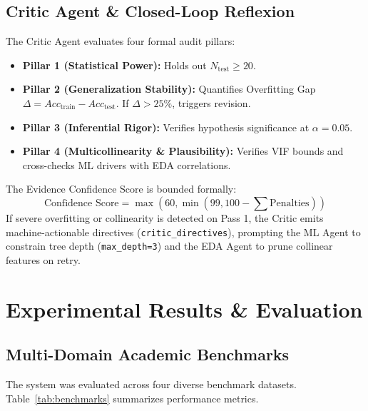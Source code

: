 \documentclass[10pt,journal,compsoc]{IEEEtran}
\begin{document}
\subsection{Critic Agent \& Closed-Loop Reflexion}
The Critic Agent evaluates four formal audit pillars:
\begin{itemize}
    \item \textbf{Pillar 1 (Statistical Power):} Holds out $N_{\text{test}} \ge 20$.
    \item \textbf{Pillar 2 (Generalization Stability):} Quantifies Overfitting Gap $\Delta = Acc_{\text{train}} - Acc_{\text{test}}$. If $\Delta > 25\%$, triggers revision.
    \item \textbf{Pillar 3 (Inferential Rigor):} Verifies hypothesis significance at $\alpha = 0.05$.
    \item \textbf{Pillar 4 (Multicollinearity \& Plausibility):} Verifies VIF bounds and cross-checks ML drivers with EDA correlations.
\end{itemize}
The Evidence Confidence Score is bounded formally:
\begin{equation}
\text{Confidence Score} = \max\left(60, \min\left(99, 100 - \sum \text{Penalties}\right)\right)
\end{equation}
If severe overfitting or collinearity is detected on Pass 1, the Critic emits machine-actionable directives (\texttt{critic\_directives}), prompting the ML Agent to constrain tree depth (\texttt{max\_depth=3}) and the EDA Agent to prune collinear features on retry.

\section{Experimental Results \& Evaluation}

\subsection{Multi-Domain Academic Benchmarks}
The system was evaluated across four diverse benchmark datasets. Table~\ref{tab:benchmarks} summarizes performance metrics.
\end{document}

